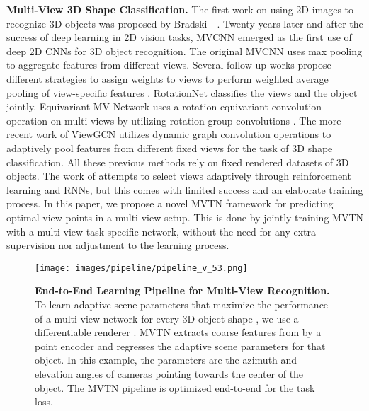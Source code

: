 \documentclass[10pt,twocolumn,letterpaper]{article}
\newcommand{\mysection}[1]{\noindent\textbf{#1.}}
\begin{document}
\mysection{Multi-View 3D Shape Classification}
The first work on using 2D images to recognize 3D objects was proposed by Bradski~\etal~\cite{bradski1994recognition}. Twenty years later and after the success of deep learning in 2D vision tasks, MVCNN \cite{mvcnn} emerged as the first use of deep 2D CNNs for 3D object recognition. The original MVCNN uses max pooling to aggregate features from different views. Several follow-up works propose different strategies to assign weights to views to perform weighted average pooling of view-specific features \cite{mvnhbn,mvrelations,mvgvcnn,mvvram}. RotationNet \cite{mvrotationnet} classifies the views and the object jointly. Equivariant MV-Network \cite{mvequivariant} uses a rotation equivariant convolution operation on multi-views by utilizing rotation group convolutions \cite{groupconv}. The more recent work of ViewGCN \cite{mvviewgcn} utilizes dynamic graph convolution operations to adaptively pool features from different fixed views for the task of 3D shape classification. All these previous methods rely on fixed rendered datasets of 3D objects. The work of \cite{mvvram} attempts to select views adaptively through reinforcement learning and RNNs, but this comes with limited success and an elaborate training process. In this paper, we propose a novel MVTN framework for predicting optimal view-points in a multi-view setup. This is done by jointly training MVTN with a multi-view task-specific network, without the need for any extra supervision nor adjustment to the learning process. 


\begin{figure*}
    \centering
    \texttt{[image: images/pipeline/pipeline\_v\_53.png]}
    \caption{\textbf{End-to-End Learning Pipeline for Multi-View Recognition.} To learn adaptive scene parameters  that maximize the performance of a multi-view network  for every 3D object shape , we use a differentiable renderer . MVTN extracts coarse features from  by a point encoder and regresses the adaptive scene parameters for that object. In this example, the parameters  are the azimuth and elevation angles of cameras pointing towards the center of the object. The MVTN pipeline is optimized end-to-end for the task loss. 
    }
    \label{fig:pipeline}
\end{figure*}
\end{document}
